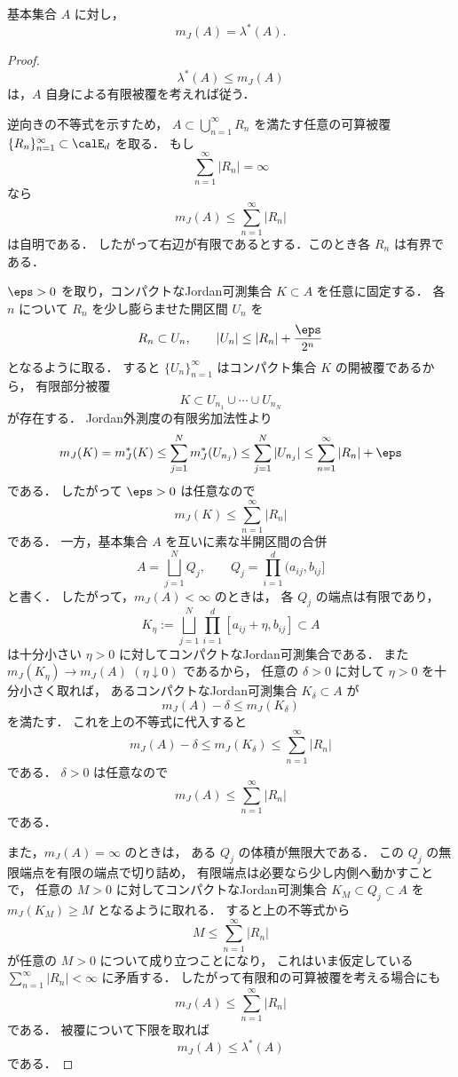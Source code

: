 \begin{proposition}
    基本集合 $A$ に対し，
    \[
    m_J(A) = \lambda^*(A).
    \]
\end{proposition}

\begin{proof}
\[
\lambda^*(A)\le m_J(A)
\]
は，$A$ 自身による有限被覆を考えれば従う．

逆向きの不等式を示すため，
$A \subset \bigcup_{n=1}^{\infty} R_n$ を満たす任意の可算被覆
$\{R_n\}_{n=1}^{\infty} \subset \calE_d$ を取る．
もし
\[
\sum_{n=1}^{\infty}|R_n|=\infty
\]
なら
\[
m_J(A)\le \sum_{n=1}^{\infty}|R_n|
\]
は自明である．
したがって右辺が有限であるとする．このとき各 $R_n$ は有界である．

$\eps>0$ を取り，コンパクトなJordan可測集合 $K\subset A$ を任意に固定する．
各 $n$ について $R_n$ を少し膨らませた開区間 $U_n$ を
\[
R_n \subset U_n,
\qquad
|U_n| \le |R_n|+\frac{\eps}{2^n}
\]
となるように取る．
すると $\{U_n\}_{n=1}^{\infty}$ はコンパクト集合 $K$ の開被覆であるから，
有限部分被覆
\[
K \subset U_{n_1}\cup\cdots\cup U_{n_N}
\]
が存在する．
Jordan外測度の有限劣加法性より
\[
m_J(K)=m_J^*(K)
\le
\sum_{j=1}^N m_J^*(U_{n_j})
\le
\sum_{j=1}^N |U_{n_j}|
\le
\sum_{n=1}^{\infty}|R_n|+\eps
\]
である．
したがって $\eps>0$ は任意なので
\[
m_J(K)\le \sum_{n=1}^{\infty}|R_n|
\]
である．
一方，基本集合 $A$ を互いに素な半開区間の合併
\[
A=\bigsqcup_{j=1}^N Q_j,
\qquad
Q_j=\prod_{i=1}^d(a_{ij},b_{ij}]
\]
と書く．
したがって，$m_J(A)<\infty$ のときは，
各 $Q_j$ の端点は有限であり，
\[
K_\eta
:=
\bigsqcup_{j=1}^N \prod_{i=1}^d [a_{ij}+\eta,b_{ij}]
\subset A
\]
は十分小さい $\eta>0$ に対してコンパクトなJordan可測集合である．
また $m_J(K_\eta)\to m_J(A)$ $(\eta\downarrow0)$ であるから，
任意の $\delta>0$ に対して $\eta>0$ を十分小さく取れば，
あるコンパクトなJordan可測集合 $K_\delta\subset A$ が
\[
m_J(A)-\delta \le m_J(K_\delta)
\]
を満たす．
これを上の不等式に代入すると
\[
m_J(A)-\delta
\le
m_J(K_\delta)
\le
\sum_{n=1}^{\infty}|R_n|
\]
である．
$\delta>0$ は任意なので
\[
m_J(A)\le \sum_{n=1}^{\infty}|R_n|
\]
である．

また，$m_J(A)=\infty$ のときは，
ある $Q_j$ の体積が無限大である．
この $Q_j$ の無限端点を有限の端点で切り詰め，
有限端点は必要なら少し内側へ動かすことで，
任意の $M>0$ に対してコンパクトなJordan可測集合
$K_M\subset Q_j\subset A$ を $m_J(K_M)\ge M$ となるように取れる．
すると上の不等式から
\[
M\le \sum_{n=1}^{\infty}|R_n|
\]
が任意の $M>0$ について成り立つことになり，
これはいま仮定している $\sum_{n=1}^{\infty}|R_n|<\infty$ に矛盾する．
したがって有限和の可算被覆を考える場合にも
\[
m_J(A)\le \sum_{n=1}^{\infty}|R_n|
\]
である．
被覆について下限を取れば
\[
m_J(A)\le \lambda^*(A)
\]
である．
\end{proof}

